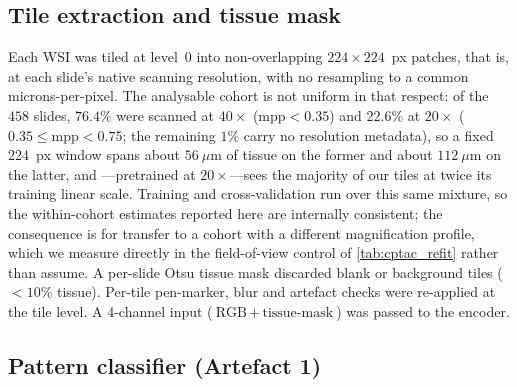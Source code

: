 \subsection*{Tile extraction and tissue mask}

Each WSI was tiled at level~0 into non-overlapping
$224 \times 224$~px patches, that is, at each slide's native scanning
resolution, with no resampling to a common microns-per-pixel.
The analysable cohort is not uniform in that respect: of the $458$
slides, $76.4\%$ were scanned at $40\times$
($\mathrm{mpp}\!<\!0.35$) and $22.6\%$ at $20\times$
($0.35\!\leq\!\mathrm{mpp}\!<\!0.75$; the remaining $1\%$ carry no
resolution metadata), so a fixed $224$~px window spans
about $56~\mu\text{m}$ of tissue on the former and about
$112~\mu\text{m}$ on the latter, and \ctranspath{}---pretrained at
$20\times$\cite{wang2022ctranspath}---sees the majority of our tiles at
twice its training linear scale.
Training and cross-validation run over this same mixture, so the
within-cohort estimates reported here are internally consistent; the
consequence is for transfer to a cohort with a different magnification
profile, which we measure directly in the field-of-view control of
\cref{tab:cptac_refit} rather than assume.
A per-slide Otsu tissue mask discarded blank or background tiles
($<10\%$ tissue).
Per-tile pen-marker, blur and artefact checks were re-applied at
the tile level.
A 4-channel input ($\text{RGB}\,+\,\text{tissue-mask}$) was passed
to the encoder.\cite{wang2022ctranspath}

\subsection*{Pattern classifier (Artefact 1)}

